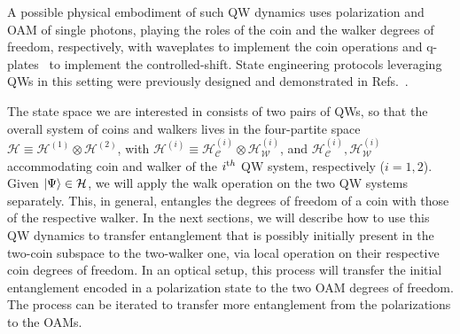 \documentclass[
	aps, pra,
	superscriptaddress, twocolumn,
	floatfix,
	10pt
]{revtex4-1}
\newcommand{\parTitle}[1]{\noindent{\color{Mahogany}(\emph{#1})}}
\newcommand{\calC}{{\mathcal{C}}}
\newcommand{\calH}{{\mathcal{H}}}
\newcommand{\calU}{{\mathcal{U}}}
\newcommand{\calV}{{\mathcal{V}}}
\newcommand{\calW}{{\mathcal{W}}}
\newcommand{\HC}{\calH_\calC}
\newcommand{\HW}{\calH_\calW}
\renewcommand{\parTitle}[1]{}
\begin{document}
A possible physical embodiment of such QW dynamics uses polarization and OAM of single photons, playing the roles of the coin and the walker degrees of freedom, respectively, with waveplates to implement the coin operations and q-plates~\cite{marrucci2006optical} to implement the controlled-shift.
State engineering protocols leveraging QWs in this setting were previously designed and demonstrated in Refs.~\cite{innocenti2017quantum,giordani2019experimental,giordani2020machine}.


\parTitle{Pairs of QWs}
The state space we are interested in consists of two  pairs of QWs, so that the overall system of coins and walkers lives in the four-partite space $\calH\equiv \calH^{(1)}\otimes\calH^{(2)}$, with
$\calH^{(i)}\equiv \HC^{(i)}\otimes\HW^{(i)}$,
and $\HC^{(i)}, \HW^{(i)}$ accommodating coin and walker of the $i^{\text th}$ QW system, respectively ($i=1,2$).
Given $\ket\Psi\in\calH$, we will apply the walk operation on the two QW systems separately.
This, in general, entangles the degrees of freedom of a coin with those of the respective walker. 
In the next sections, we will describe how to use this QW dynamics to transfer entanglement that is possibly initially present in the two-coin subspace to the two-walker one, via local operation on their respective coin degrees of freedom.
In an optical setup, this process will transfer the initial entanglement encoded in a polarization state to the two OAM degrees of freedom. The process can be iterated to transfer more entanglement from the polarizations to the OAMs.
\end{document}
